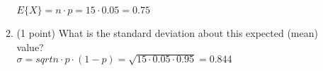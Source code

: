\documentclass{article}
\begin{document}
\begin{enumerate}
\begin{enumerate}
	\textbf{$E\{X\} = n \cdot p = 15 \cdot 0.05 = 0.75$} \\
	
	\item (1 point) What is the standard deviation about this expected (mean) value? \\
	
	\textbf{$\sigma = sqrt{n \cdot p \cdot \left( 1-p \right)} = \sqrt{15 \cdot 0.05 \cdot 0.95} = 0.844$}
	\end{enumerate}



\end{enumerate}
\end{document}
